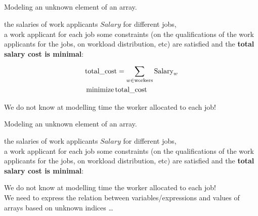 \documentclass{cons-beamer}
\begin{document}
\subsection{}

\begin{frame}
  Modeling an \textcolor{Melon}{unknown element of an array}.
  \vfill

  \begin{example}
     the salaries of work applicants $Salary$ for different jobs, \\
     a work applicant
    for each job  some constraints (on the
    qualifications of the work applicants for the jobs, on workload
    distribution, etc) are satisfied and the \textbf{total salary cost is
    minimal}: 

    \begin{align*}
      &\text{total\_cost} = \sum_{ w \in \text{workers}} \text{Salary}_{w}\\
      &\operatorname*{minimize} \text{total\_cost}
    \end{align*}
    
    \vfill
    \alert{We do not know at modelling time the worker allocated to each job!}
  \end{example}
\end{frame}

\begin{flashcardcpmpy}
\begin{frame}
  Modeling an \textcolor{Melon}{unknown element of an array}.
  \vfill

  \begin{example}
     the salaries of work applicants $Salary$ for different jobs, \\
     a work applicant
    for each job  some constraints (on the
    qualifications of the work applicants for the jobs, on workload
    distribution, etc) are satisfied and the \textbf{total salary cost is
    minimal}: 
    \vfill

     \vfill
    \vfill

    \alert{We do not know at modelling time the worker allocated to each job!} \\ \vfill
    We need to express the relation between variables/expressions and values of arrays based on unknown indices \dots
  \end{example}
\end{frame}
\end{flashcardcpmpy}
\end{document}

